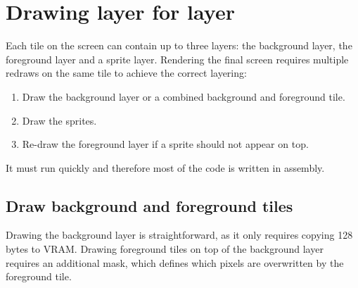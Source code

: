 \documentclass[book.tex]{subfiles}
\begin{document}
\par
\begin{minipage}{\textwidth}
  
\end{minipage}


\section{Drawing layer for layer}
Each tile on the screen can contain up to three layers: the background layer, the foreground layer and a sprite layer. Rendering the final screen requires multiple redraws on the same tile to achieve the correct layering:
\begin{enumerate}
  \item Draw the background layer or a combined background and foreground tile.
  \item Draw the sprites.
  \item Re-draw the foreground layer if a sprite should not appear on top.
\end{enumerate}

\par
It must run quickly and therefore most of the code is written in assembly.

\subsection{Draw background and foreground tiles}
Drawing the background layer is straightforward, as it only requires copying 128 bytes to VRAM. Drawing foreground tiles on top of the background layer requires an additional mask, which defines which pixels are overwritten by the foreground tile.\\
\end{document}
